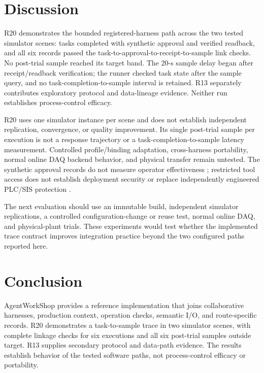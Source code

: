 \section{Discussion}
\label{sec:limits}
R20 demonstrates the bounded registered-harness path across the two tested
simulator scenes: tasks completed with synthetic approval and verified
readback, and all six records passed the task-to-approval-to-receipt-to-sample
link checks. No post-trial sample reached its target band. The 20-s sample
delay began after receipt/readback verification; the runner checked task state
after the sample query, and no task-completion-to-sample interval is retained.
R13 separately contributes exploratory protocol and data-lineage evidence.
Neither run establishes process-control efficacy.

R20 uses one simulator instance per scene and does not establish independent
replication, convergence, or quality improvement. Its single post-trial
sample per execution is not a response trajectory or a
task-completion-to-sample latency measurement. Controlled profile/binding
adaptation, cross-harness portability, normal online DAQ backend behavior, and
physical transfer remain untested. The synthetic approval records do not
measure operator effectiveness
\cite{parasuramanmanzey2010complacency,parasuraman2000model,bainbridge1983ironies};
restricted tool access does not establish deployment security
\cite{greshake2023injection,liu2024pinjection,iec62443-3-3} or replace
independently engineered PLC/SIS protection \cite{iec61511}.

The next evaluation should use an immutable build, independent simulator
replications, a controlled configuration-change or reuse test, normal online
DAQ, and physical-plant trials. These experiments would test whether the
implemented trace contract improves integration practice beyond the two
configured paths reported here.

\section{Conclusion}
\label{sec:conclusion}
AgentWorkShop provides a reference implementation that joins collaborative
harnesses, production context, operation checks, semantic I/O, and
route-specific records. R20 demonstrates a task-to-sample trace in two
simulator scenes, with complete linkage checks for six executions and all six
post-trial samples outside target. R13 supplies secondary protocol and
data-path evidence. The results establish behavior of the tested software
paths, not process-control efficacy or portability.
